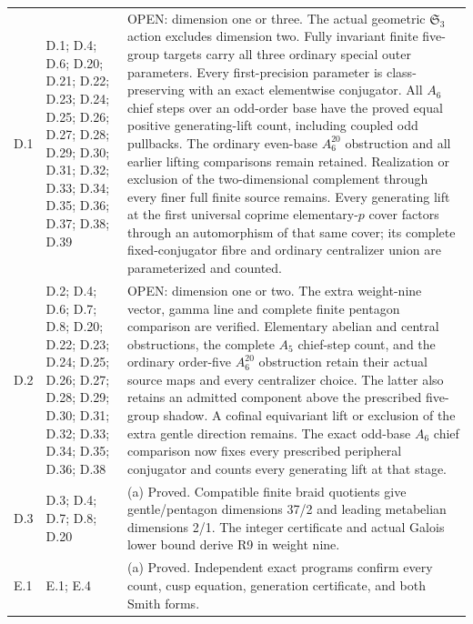 \begin{longtable}{@{}p{1.1cm}p{3.0cm}p{10.3cm}@{}}
D.1 & D.1; D.4; D.6; D.20; D.21; D.22; D.23; D.24; D.25; D.26; D.27; D.28; D.29; D.30; D.31; D.32; D.33; D.34; D.35; D.36; D.37; D.38; D.39 & OPEN: dimension one or three. The actual geometric $\mathfrak S_3$ action excludes dimension two. Fully invariant finite five-group targets carry all three ordinary special outer parameters. Every first-precision parameter is class-preserving with an exact elementwise conjugator. All $A_6$ chief steps over an odd-order base have the proved equal positive generating-lift count, including coupled odd pullbacks. The ordinary even-base $A_6^{20}$ obstruction and all earlier lifting comparisons remain retained. Realization or exclusion of the two-dimensional complement through every finer full finite source remains. Every generating lift at the first universal coprime elementary-$p$ cover factors through an automorphism of that same cover; its complete fixed-conjugator fibre and ordinary centralizer union are parameterized and counted. \\
D.2 & D.2; D.4; D.6; D.7; D.8; D.20; D.22; D.23; D.24; D.25; D.26; D.27; D.28; D.29; D.30; D.31; D.32; D.33; D.34; D.35; D.36; D.38 & OPEN: dimension one or two. The extra weight-nine vector, gamma line and complete finite pentagon comparison are verified. Elementary abelian and central obstructions, the complete $A_5$ chief-step count, and the ordinary order-five $A_6^{20}$ obstruction retain their actual source maps and every centralizer choice. The latter also retains an admitted component above the prescribed five-group shadow. A cofinal equivariant lift or exclusion of the extra gentle direction remains. The exact odd-base $A_6$ chief comparison now fixes every prescribed peripheral conjugator and counts every generating lift at that stage. \\
D.3 & D.3; D.4; D.7; D.8; D.20 & (a) Proved. Compatible finite braid quotients give gentle/pentagon dimensions 37/2 and leading metabelian dimensions 2/1. The integer certificate and actual Galois lower bound derive R9 in weight nine. \\
E.1 & E.1; E.4 & (a) Proved. Independent exact programs confirm every count, cusp equation, generation certificate, and both Smith forms. \\

\end{longtable}
